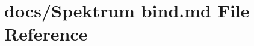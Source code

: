 \hypertarget{Spektrum_01bind_8md}{\section{docs/\+Spektrum bind.\+md File Reference}
\label{Spektrum_01bind_8md}
}
